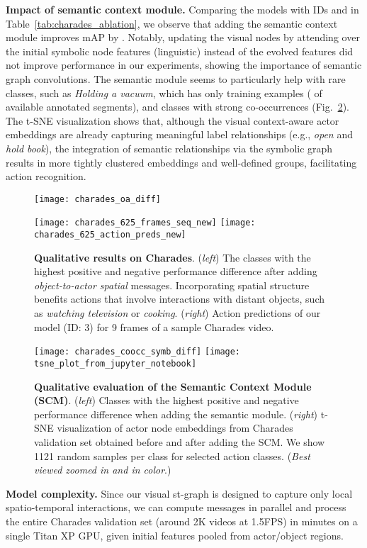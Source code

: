 \documentclass[runningheads]{llncs}
\begin{document}
\textbf{Impact of semantic context module.} Comparing the models with IDs  and  in Table~\ref{tab:charades_ablation}, we observe that adding the semantic context module improves mAP by . Notably, updating the visual nodes by attending over the initial symbolic node features (linguistic) instead of the evolved features did not improve performance in our experiments, showing the importance of semantic graph convolutions. The semantic module seems to particularly help with rare classes, such as \emph{Holding a vacuum}, which has only  training examples ( of available annotated segments), and classes with strong co-occurrences (Fig.~\ref{fig:tsne}). The t-SNE visualization shows that, although the visual context-aware actor embeddings are already capturing
meaningful label relationships (e.g., \emph{open} and \emph{hold book}), the integration of semantic relationships via the symbolic graph results in more tightly clustered embeddings and well-defined groups, facilitating action recognition.
\begin{figure}[ht]
\begin{minipage}{0.45\textwidth}
   \centering\texttt{[image: charades\_oa\_diff]}
\end{minipage}
\begin{minipage}{0.45\textwidth}
\centering\texttt{[image: charades\_625\_frames\_seq\_new]}
\centering\texttt{[image: charades\_625\_action\_preds\_new]}
\end{minipage}
   \caption{\textbf{Qualitative results on Charades}. (\emph{left}) The classes with the highest positive and negative performance difference after adding \emph{object-to-actor spatial} messages. Incorporating spatial structure benefits actions that involve interactions with distant objects, such as \emph{watching television} or \emph{cooking}. (\emph{right}) Action predictions of our model (ID: 3) for 9 frames of a sample Charades video.
}
\label{fig:charades_diff_per_class}
\end{figure}
\begin{figure}[ht]
\centering\texttt{[image: charades\_coocc\_symb\_diff]}
\centering\texttt{[image: tsne\_plot\_from\_jupyter\_notebook]}
 \caption{\textbf{Qualitative evaluation of the Semantic Context Module (SCM)}. (\emph{left}) Classes with the highest positive and negative performance difference when adding the semantic module. (\emph{right}) t-SNE visualization of actor node embeddings from Charades validation set obtained before and after adding the SCM. We show 1121 random samples per class for  selected action classes. (\emph{Best viewed zoomed in and in color}.)}
\label{fig:tsne}
\end{figure}
\textbf{Model complexity.} Since our visual st-graph is designed to capture only local spatio-temporal interactions, we can compute messages in parallel and process the entire Charades validation set (around 2K videos at 1.5FPS) in
 minutes on a single Titan XP GPU, given initial features pooled from actor/object regions. 
\end{document}
